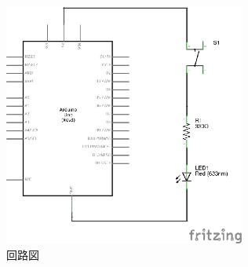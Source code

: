 \documentclass[11pt,a4paper]{jarticle}
\begin{document}


\begin{figure}[h!]
 \centering
 \includegraphics[height=80mm]{img/circuit01.eps}
 \caption{回路図}
\end{figure}
\end{document}
